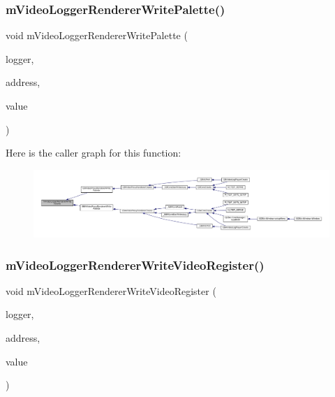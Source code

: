 \subsubsection{\texorpdfstring{m\+Video\+Logger\+Renderer\+Write\+Palette()}{mVideoLoggerRendererWritePalette()}}
{\footnotesize\ttfamily void m\+Video\+Logger\+Renderer\+Write\+Palette (\begin{DoxyParamCaption}\item[{struct m\+Video\+Logger $\ast$}]{logger,  }\item[{uint32\+\_\+t}]{address,  }\item[{uint16\+\_\+t}]{value }\end{DoxyParamCaption})}

Here is the caller graph for this function\+:
\nopagebreak
\begin{figure}[H]
\begin{center}
\leavevmode
\includegraphics[width=350pt]{video-logger_8c_a00131ffac3e67e4c8615fe36d9aad49c_icgraph}
\end{center}
\end{figure}
\mbox{\label{video-logger_8c_a92cbf883be4c238b029ff28a8b905841}} 
\subsubsection{\texorpdfstring{m\+Video\+Logger\+Renderer\+Write\+Video\+Register()}{mVideoLoggerRendererWriteVideoRegister()}}
{\footnotesize\ttfamily void m\+Video\+Logger\+Renderer\+Write\+Video\+Register (\begin{DoxyParamCaption}\item[{struct m\+Video\+Logger $\ast$}]{logger,  }\item[{uint32\+\_\+t}]{address,  }\item[{uint16\+\_\+t}]{value }\end{DoxyParamCaption})}

